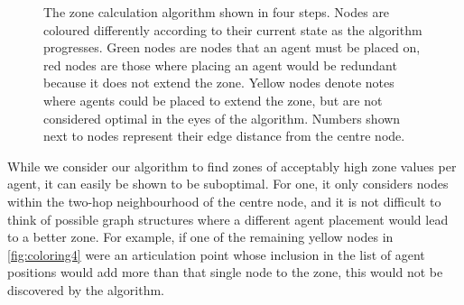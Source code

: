 \begin{figure}
  \caption{The zone calculation algorithm shown in four steps.
           Nodes are coloured differently according to their current state as the algorithm progresses.
           Green nodes are nodes that an agent must be placed on, red nodes are those where placing an agent would be redundant because it does not extend the zone.
           Yellow nodes denote notes where agents could be placed to extend the zone, but are not considered optimal in the eyes of the algorithm.
           Numbers shown next to nodes represent their edge distance from the centre node.}
  \label{fig:zones}
\end{figure}
While we consider our algorithm to find zones of acceptably high zone values per agent, it can easily be shown to be suboptimal.
For one, it only considers nodes within the two-hop neighbourhood of the centre node, and it is not difficult to think of possible graph structures where a different agent placement would lead to a better zone.
For example, if one of the remaining yellow nodes in \autoref{fig:coloring4} were an articulation point whose inclusion in the list of agent positions would add more than that single node to the zone, this would not be discovered by the algorithm.
